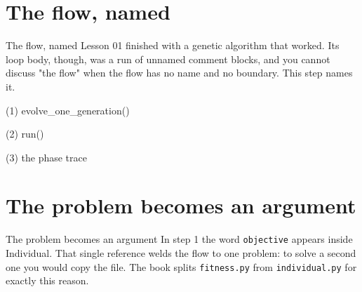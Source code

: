 \section{The flow, named}

\begin{frame}{The flow, named}
Lesson 01 finished with a genetic algorithm that worked. Its loop body, though,
was a run of unnamed comment blocks, and you cannot discuss "the flow" when the
flow has no name and no boundary. This step names it.
\end{frame}

\begin{frame}[fragile]{(1) evolve\_one\_generation()}

\end{frame}

\begin{frame}[fragile]{(2) run()}

\end{frame}

\begin{frame}[fragile]{(3) the phase trace}

\end{frame}


\section{The problem becomes an argument}

\begin{frame}{The problem becomes an argument}
In step 1 the word \texttt{objective} appears inside Individual. That single reference
welds the flow to one problem: to solve a second one you would copy the file.
The book splits \texttt{fitness.py} from \texttt{individual.py} for exactly this reason.
\end{frame}

